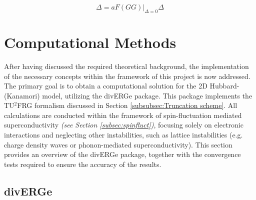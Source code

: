 \documentclass[12pt]{article}
\begin{document}
\begin{equation}\label{gapeq}
    \Delta = aF(GG)|_{\Delta = 0}\Delta
\end{equation}



\section{Computational Methods}

After having discussed the required theoretical background, the implementation of the necessary concepts within the framework of
this project is now addressed. The primary goal is to obtain a computational solution 
for the 2D Hubbard-(Kanamori) model, utilizing the divERGe package. This package implements the TU$^2$FRG
formalism discussed in Section \ref{subsubsec:Truncation scheme}.
All calculations are conducted within the framework of spin-fluctuation mediated 
superconductivity \textit{(see Section \ref{subsec:spinfluct})}, focusing solely on  
electronic interactions and neglecting other instabilities, such as lattice 
instabilities (e.g. charge density waves or phonon-mediated superconductivity). 
This section provides an overview of the divERGe package, together with the convergence
tests required to ensure the accuracy of the results. 

\subsection{divERGe}
\label{subsec:diverge}
\end{document}
